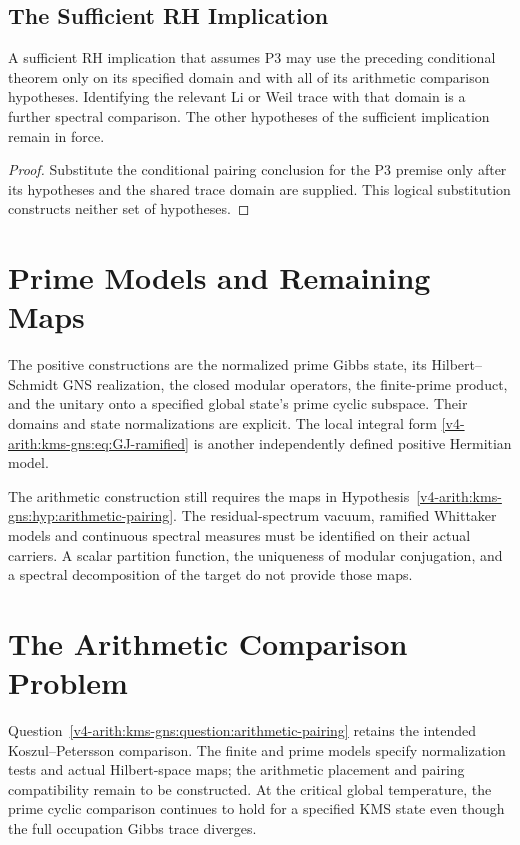 \subsection{The Sufficient RH Implication}
\label{v4-arith:kms-gns:P3:rh}
\begin{corollary}
\label{v4-arith:kms-gns:cor:rh-minimal-updated}
A sufficient RH implication that assumes P3 may use the preceding
conditional theorem only on its specified domain and with all of
its arithmetic comparison hypotheses. Identifying the relevant
Li or Weil trace with that domain is a further spectral comparison.
The other hypotheses of the sufficient implication remain in force.
\end{corollary}
\begin{proof}
Substitute the conditional pairing conclusion for the P3 premise
only after its hypotheses and the shared trace domain are supplied.
This logical substitution constructs neither set of hypotheses.
\end{proof}

\section{Prime Models and Remaining Maps}
\label{v4-arith:kms-gns:residual-list}
\label{v4-arith:kms-gns:verification}

The positive constructions are the normalized prime Gibbs state,
its Hilbert--Schmidt GNS realization, the closed modular operators,
the finite-prime product, and the unitary onto a specified global
state's prime cyclic subspace. Their domains and state
normalizations are explicit. The local integral form
\eqref{v4-arith:kms-gns:eq:GJ-ramified} is another independently
defined positive Hermitian model.

The arithmetic construction still requires the maps in
Hypothesis~\ref{v4-arith:kms-gns:hyp:arithmetic-pairing}. The
residual-spectrum vacuum, ramified Whittaker models and continuous
spectral measures must be identified on their actual carriers.
A scalar partition function, the uniqueness of modular conjugation,
and a spectral decomposition of the target do not provide those
maps.

\section{The Arithmetic Comparison Problem}
\label{v4-arith:kms-gns:summary}

Question~\ref{v4-arith:kms-gns:question:arithmetic-pairing} retains
the intended Koszul--Petersson comparison. The finite and prime
models specify normalization tests and actual Hilbert-space maps;
the arithmetic placement and pairing compatibility remain to be
constructed. At the critical global temperature, the prime cyclic
comparison continues to hold for a specified KMS state even though
the full occupation Gibbs trace diverges.
